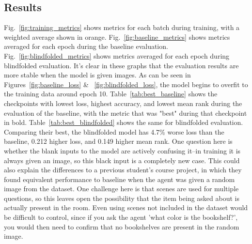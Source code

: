\subsection{Results}
Fig.~\ref{fig:training_metrics} shows metrics for each batch during training, with a weighted average shown in orange. %
Fig.~\ref{fig:baseline_metrics} shows metrics averaged for each epoch during the baseline evaluation. Fig.~\ref{fig:blindfolded_metrics} shows metrics averaged for each epoch during blindfolded evaluation. It's clear in these graphs that the evaluation results are more stable when the model is given images. As can be seen in Figures~\ref{fig:baseline_loss} \& ~\ref{fig:blindfolded_loss}, the model begins to overfit to the training data around epoch 10. \newline %
Table~\ref{tab:best_baseline} shows the checkpoints with lowest loss, highest accuracy, and lowest mean rank during the evaluation of the baseline, with the metric that was "best" during that checkpoint in bold. Table~\ref{tab:best_blindfolded} shows the same for blindfolded evaluation. Comparing their best, the blindfolded model has 4.7\% worse loss than the baseline, 0.212 higher loss, and 0.149 higher mean rank. \newline %
One question here is whether the blank inputs to the model are actively confusing it--in training it is always given an image, so this black input is a completely new case. This could also explain the differences to a previous student's course project, in which they found equivalent performance to baseline when the agent was given a random image from the dataset. One challenge here is that scenes are used for multiple questions, %
so this leaves open the possibility that the item being asked about is actually present in the room. Even using scenes not included in the dataset would be difficult to control, since if you ask the agent 'what color is the bookshelf?', you would then need to confirm that no bookshelves are present in the random image. \newline


